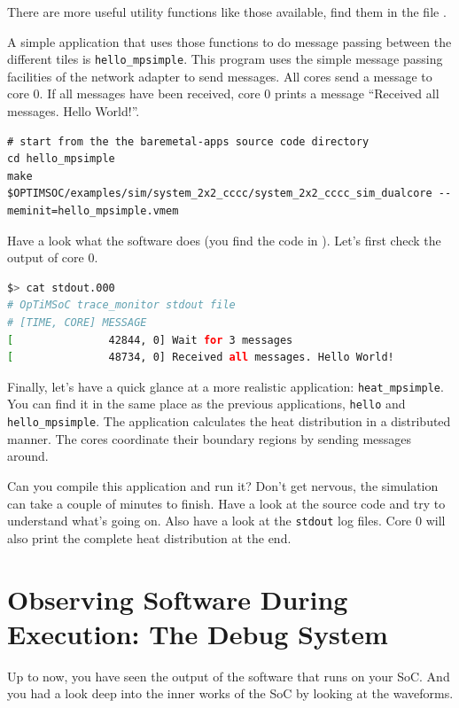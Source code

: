 There are more useful utility functions like those available, find them in the
file .

A simple application that uses those functions to do message passing between
the different tiles is \verb|hello_mpsimple|. This program uses
the simple message passing facilities of the network adapter to send messages.
All cores send a message to core 0. If all messages have been received, core 0
prints a message ``Received all messages. Hello World!''.

\begin{lstlisting}
# start from the the baremetal-apps source code directory
cd hello_mpsimple
make
$OPTIMSOC/examples/sim/system_2x2_cccc/system_2x2_cccc_sim_dualcore --meminit=hello_mpsimple.vmem
\end{lstlisting}

Have a look what the software does (you find the code in
). Let's
first check the output of core 0.

\begin{lstlisting}[language=sh]
$> cat stdout.000
# OpTiMSoC trace_monitor stdout file
# [TIME, CORE] MESSAGE
[               42844, 0] Wait for 3 messages
[               48734, 0] Received all messages. Hello World!
\end{lstlisting}

\vspace{2em}

Finally, let's have a quick glance at a more realistic application:
\verb|heat_mpsimple|. You can find it in the same place as the previous
applications, \verb|hello| and \verb|hello_mpsimple|. The application
calculates the heat distribution in a distributed manner. The cores coordinate
their boundary regions by sending messages around.

Can you compile this application and run it? Don't get nervous, the simulation
can take a couple of minutes to finish. Have a look at the source code and try
to understand what's going on. Also have a look at the \verb|stdout| log files.
Core 0 will also print the complete heat distribution at the end.


\section{Observing Software During Execution: The Debug System}
\label{sec:tutorials:debug_system_intro}

Up to now, you have seen the output of the software that runs on your SoC.
And you had a look deep into the inner works of the SoC by looking at the waveforms.


